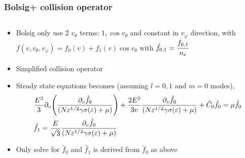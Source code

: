 \documentclass[mathserif, aspectratio=169]{beamer}
\newcommand{\vect}[1]{\boldsymbol{#1}}
\newcommand{\of}[1]{\mleft( #1 \mright)}
\newcommand{\myint}{\int\limits}
\newcommand{\diff}[1]{\, d#1}
\newcommand{\vtheta}{{v_{\theta}}}
\newcommand{\vphi}{v_{\varphi}}
\begin{document}
\begin{frame}
	\frametitle{Bolsig+ collision operator}
	\begin{columns}
		\begin{column}{\textwidth}
			\begin{itemize}
				\item Bolsig only use 2 $\vtheta$ terms: $1, \cos\vtheta$ and constant in $\vphi$ direction, with $f(v,\vtheta,\vphi) = f_0(v) + f_1(v) \cos\vtheta$ with $\hat{f}_{0,1} = \cfrac{f_{0,1}}{n_e}$
				\item Simplified collision operator
				\item Steady state equations becomes (assuming $l=0,1$ and $m=0$ modes), 
				\begin{align}
					&\frac{E^2}{3} \partial_{v} \of{\frac{\partial_v \hat f_0}{(N \varepsilon^{1/2}\gamma \sigma\of{\varepsilon} + \mu)}} + \frac{2E^2}{3v} \frac{\partial_v \hat{f_0}}{(N \varepsilon^{1/2}\gamma \sigma\of{\varepsilon} + \mu)} + \tilde C_0 \hat{f_0} = \mu \hat{f_0} \\
					&\hat{f_1} = \frac{E}{\sqrt{3}} \frac{\partial_{v}\hat{f_0}}{(N \varepsilon^{1/2}\gamma \sigma\of{\varepsilon} + \mu)}
				\end{align}
				\item Only solve for $\hat{f}_0$ and $\hat{f}_1$ is derived from $\hat{f}_0$ as above
			\end{itemize}
		\end{column}
			
	\end{columns}
\end{frame}
\end{document}
